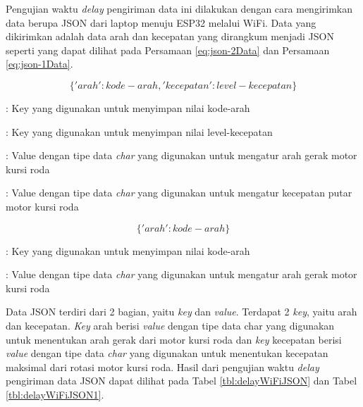 Pengujian waktu \emph{delay} pengiriman data ini dilakukan dengan cara mengirimkan data berupa JSON dari laptop menuju ESP32 melalui WiFi. Data yang dikirimkan adalah data arah dan kecepatan yang dirangkum menjadi JSON seperti yang dapat dilihat pada Persamaan \ref{eq:json-2Data} dan Persamaan \ref{eq:json-1Data}. 

\begin{equation}
  \label{eq:json-2Data}
    \{'arah': kode-arah, 'kecepatan': level-kecepatan\}
\end{equation}

\begin{description}[nolistsep]
  \item[Keterangan]
  \item[arah] : Key yang digunakan untuk menyimpan nilai kode-arah
  \item[kecepatan] : Key yang digunakan untuk menyimpan nilai level-kecepatan
  \item[kode-arah] : Value dengan tipe data \emph{char} yang digunakan untuk mengatur arah gerak motor kursi roda
  \item[level-kecepatan] : Value dengan tipe data \emph{char} yang digunakan untuk mengatur kecepatan putar motor kursi roda 
\end{description}

\begin{equation}
  \label{eq:json-1Data}
    \{'arah': kode-arah\}
\end{equation}

\begin{description}[nolistsep]
  \item[Keterangan]
  \item[arah] : Key yang digunakan untuk menyimpan nilai kode-arah
  \item[kode-arah] : Value dengan tipe data \emph{char} yang digunakan untuk mengatur arah gerak motor kursi roda 
\end{description}

Data JSON terdiri dari 2 bagian, yaitu \emph{key} dan \emph{value}. Terdapat 2 \emph{key}, yaitu arah dan kecepatan. \emph{Key} arah berisi \emph{value} dengan tipe data char yang digunakan untuk menentukan arah gerak dari motor kursi roda dan \emph{key} kecepatan berisi \emph{value} dengan tipe data \emph{char} yang digunakan untuk menentukan kecepatan maksimal dari rotasi motor kursi roda. Hasil dari pengujian waktu \emph{delay} pengiriman data JSON dapat dilihat pada Tabel \ref{tbl:delayWiFiJSON} dan Tabel \ref{tbl:delayWiFiJSON1}.

